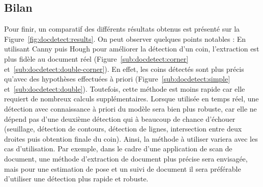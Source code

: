 \subsection{Bilan}
\label{subsec:doc:bilan}
Pour finir, un comparatif des différents résultats obtenus est présenté sur la Figure~\ref{fig:docdetect:results}.
On peut observer quelques points notables : En utilisant Canny puis Hough pour améliorer la détection d'un coin, l'extraction est plus fidèle au document réel (Figure~\ref{sub:docdetect:corner} et~\ref{sub:docdetect:double-corner}). En effet, les coins détectés sont plus précis qu'avec des hypothèses effectuées à priori (Figure~\ref{sub:docdetect:simple} et~\ref{sub:docdetect:double}). Toutefois, cette méthode est moins rapide car elle requiert de nombreux calculs supplémentaires. Lorsque utilisée en temps réel, une détection avec connaissance à priori du modèle sera bien plus robuste, car elle ne dépend pas d'une deuxième détection qui à beaucoup de chance d'échouer (seuillage, détection de contours, détection de lignes, intersection entre deux droites puis obtention finale du coin). Ainsi, la méthode à utiliser variera avec les cas d'utilisation. Par exemple, dans le cadre d'une application de scan de document, une méthode d'extraction de document plus précise sera envisagée, mais pour une estimation de pose et un suivi de document il sera préférable d'utiliser une détection plus rapide et robuste.

